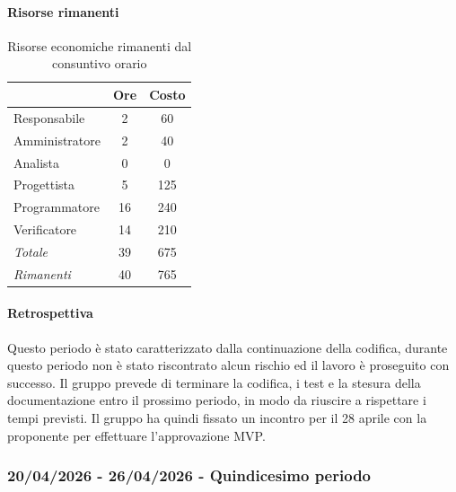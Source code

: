 \documentclass[a4paper,12pt]{article}
\begin{document}
            \paragraph{Risorse rimanenti}
                \begin{table}[H]
                \centering
                \caption{Risorse economiche rimanenti dal consuntivo orario}
                \begin{tabular}{|l|c|c|}
                \hline
                    \rowcolor{lightgray}{\textbf{Ruolo}} & {\textbf{Ore}} & {\textbf{Costo}}\\
                \hline
                    Responsabile & 2 & 60\\
                \hline
                    Amministratore & 2 & 40\\
                \hline
                    Analista & 0 & 0\\
                \hline
                    Progettista & 5 & 125\\
                \hline
                    Programmatore & 16 & 240\\
                \hline
                    Verificatore & 14 & 210\\
                \hline
                    \rowcolor{lightgray}\textit{Totale} & 39 & 675\\
                \hline
                    \rowcolor{lightgray}\textit{Rimanenti} & 40 & 765\\
                \hline
                \end{tabular}
                \end{table}
                
            \paragraph{Retrospettiva}
            Questo periodo è stato caratterizzato dalla continuazione della codifica, durante questo periodo non è stato riscontrato alcun rischio ed il lavoro è proseguito con successo.
            Il gruppo prevede di terminare la codifica, i test e la stesura della documentazione entro il prossimo periodo, in modo da riuscire a rispettare i tempi previsti.
            Il gruppo ha quindi fissato un incontro per il 28 aprile con la proponente per effettuare l'approvazione MVP.

        \subsubsection{20/04/2026 - 26/04/2026 - Quindicesimo periodo}
\end{document}
